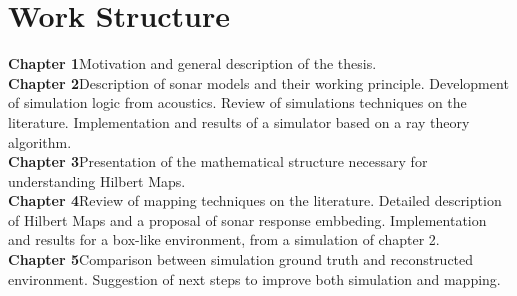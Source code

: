\section{Work Structure}

\textbf{Chapter 1}\quad Motivation and general description of the thesis.
\\
\textbf{Chapter 2}\quad Description of sonar models and their working
principle. Development of simulation logic from acoustics. Review of
simulations techniques on the literature. Implementation and results of a
simulator based on a ray theory algorithm.
\\
\textbf{Chapter 3}\quad Presentation of the mathematical structure necessary for
understanding Hilbert Maps.
\\
\textbf{Chapter 4}\quad Review of mapping techniques on the literature.
Detailed description of Hilbert Maps and a proposal of sonar response embbeding.
Implementation and results for a box-like environment, from a simulation of
chapter 2.
\\
\textbf{Chapter 5}\quad Comparison between simulation ground truth and
reconstructed environment. Suggestion of next steps to improve both simulation
and mapping.
% 
% 
% 
% 
% 
% 
% 
% 
